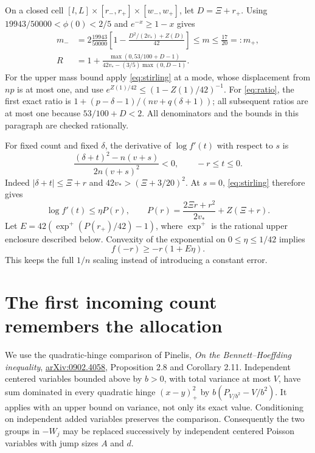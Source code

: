 \documentclass[11pt,a4paper]{article}
\begin{document}
On a closed cell $[l,L]\times[r_-,r_+]\times[w_-,w_+]$, let
$D=\Xi+r_+$. Using $19943/50000<\phi(0)<2/5$ and
$e^{-x}\ge1-x$ gives
\begin{align}
 m_-&=2\frac{19943}{50000}
       \left[1-\frac{D^2/(2v_*)+Z(D)}{42}\right]\le m\le\frac{17}{20}=:m_+,
       \label{eq:mass}\\
 R&=1+\frac{\max(0,53/100+D-1)}
              {42v_*-(3/5)\max(0,D-1)}.\label{eq:ratio}
\end{align}
For the upper mass bound apply \eqref{eq:stirling} at a mode, whose
displacement from $np$ is at most one, and use
$e^{Z(1)/42}\le(1-Z(1)/42)^{-1}$. For \eqref{eq:ratio}, the first
exact ratio is $1+(p-\delta-1)/(nv+q(\delta+1))$; all subsequent
ratios are at most one because $53/100+D<2$.
All denominators and the bounds in this paragraph are checked rationally.

For fixed count and fixed $\delta$, the derivative of $\log f'(t)$ with
respect to $s$ is
\[
 \frac{(\delta+t)^2-n(v+s)}{2n(v+s)^2}<0,
 \qquad -r\le t\le0.
\]
Indeed $|\delta+t|\le\Xi+r$ and $42v_*>(\Xi+3/20)^2$.
At $s=0$, \eqref{eq:stirling} therefore gives
\[
 \log f'(t)\le\eta P(r),\qquad
 P(r)=\frac{2\Xi r+r^2}{2v_*}+Z(\Xi+r).
\]
Let $E=42(\exp^+(P(r_+)/42)-1)$, where $\exp^+$ is the rational
upper enclosure described below. Convexity of the exponential on
$0\le\eta\le1/42$ implies
\begin{equation}\label{eq:phase}
                       f(-r)\ge-r(1+E\eta).
\end{equation}
This keeps the full $1/n$ scaling instead of introducing a constant error.

\section{The first incoming count remembers the allocation}
We use the quadratic-hinge comparison of Pinelis,
\emph{On the Bennett--Hoeffding inequality},
\href{https://arxiv.org/abs/0902.4058}{arXiv:0902.4058},
Proposition 2.8 and Corollary 2.11. Independent centered variables bounded
above by $b>0$, with total variance at most $V$, have sum dominated in every
quadratic hinge $(x-y)_+^2$ by $b(P_{V/b^2}-V/b^2)$.
It applies with an upper bound on variance, not only its exact value.
Conditioning on independent added variables preserves the comparison.
Consequently the two groups in $-W_j$ may be replaced successively by
independent centered Poisson variables with jump sizes $A$ and $d$.
\end{document}
